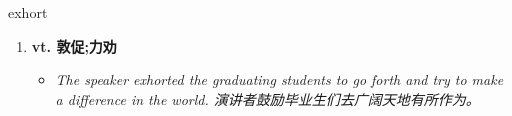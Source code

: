 
\begin{frame}
{\huge exhort}
\begin{center}
\begin{enumerate}\Large
  \item \textbf{vt. 敦促;力劝}
  \begin{itemize}
    \item \em{\Large{The speaker exhorted the graduating students to go forth and try to make a difference in the world. 演讲者鼓励毕业生们去广阔天地有所作为。}}
  \end{itemize}
\end{enumerate}
\end{center}
\end{frame}
